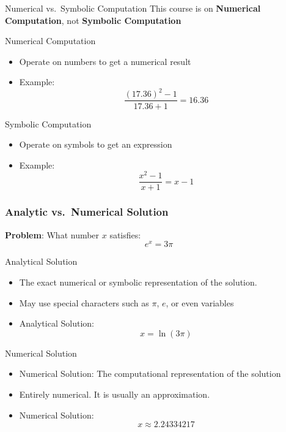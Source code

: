 \documentclass[10pt]{beamer}
\begin{document}
\begin{frame}{Numerical vs.~Symbolic Computation}
This course is on \textbf{Numerical Computation}, not \textbf{Symbolic Computation}
\begin{block}{Numerical Computation}
    \begin{itemize}
        \item Operate on numbers to get a numerical result
        \item Example: 
        \[
        \frac{(17.36)^2 - 1}{17.36 + 1} = 16.36
        \]
    \end{itemize}
\end{block}

\begin{block}{Symbolic Computation}
    \begin{itemize}
        \item Operate on symbols to get an expression
        \item Example: 
        \[
        \frac{x^2 - 1}{x + 1} = x-1
        \]
    \end{itemize}
\end{block}

\end{frame}
\begin{frame}
\frametitle{Analytic vs.~Numerical Solution}

\textbf{Problem}: What number $x$ satisfies:  $$e^x = 3\pi $$
\begin{block}{Analytical Solution}
\begin{itemize}
    \item The exact numerical or symbolic representation of the solution.
    \item May use special characters such as $\pi$, $e$, or even variables
    \item Analytical Solution:
    $$ x = \ln(3\pi)$$
\end{itemize}

\end{block}
\begin{block}{Numerical Solution}
\begin{itemize}
    \item Numerical Solution: The computational representation of the solution
    \item Entirely numerical. It is usually an approximation.
    \item Numerical Solution:
    $$ x \approx 2.24334217$$
\end{itemize}
\end{block}

\end{frame}
\end{document}
